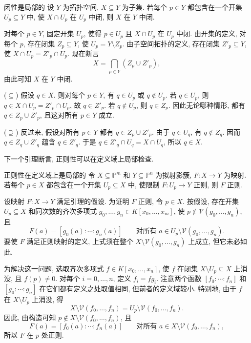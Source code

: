 \begin{Lemma}{闭性是局部的}\leavevmode\label{lem:closedness-is-local}
设 $Y$ 为拓扑空间, $X\subseteq Y$ 为子集. 若每个 $p\in Y$ 都包含在一个开集 $U_{p}\subseteq Y$ 中, 使 $X\cap U_{p}$ 在 $U_{p}$ 中闭, 则 $X$ 在 $Y$ 中闭.
\end{Lemma}
\begin{Proof}
对每个 $p\in Y$, 固定开集 $U_{p}$, 使得 $p\in U_{p}$ 且 $X\cap U_{p}$ 在 $U_{p}$ 中闭. 由开集的定义, 对每个 $p$, 存在闭集 $Z_{p}\subseteq Y$, 使 $U_{p}=Y\setminus Z_{p}$. 由子空间拓扑的定义, 存在闭集 $Z'_{p}\subseteq Y$, 使 $X\cap U_{p}=Z'_{p}\cap U_{p}$. 现在断言
\[
  X=\bigcap_{p\in Y}(Z_{p}\cup Z'_{p}),
\]
由此可知 $X$ 在 $Y$ 中闭.

($\subseteq$) 假设 $q\in X$. 则对每个 $p\in Y$, 有 $q\in U_{p}$ 或 $q\notin U_{p}$. 若 $q\in U_{p}$, 则 $q\in X\cap U_{p}=Z'_{p}\cap U_{p}$, 故 $q\in Z'_{p}$. 若 $q\notin U_{p}$, 则 $q\in Z_{p}$. 因此无论哪种情形, 都有 $q\in Z_{p}\cup Z'_{p}$, 且这对所有 $p\in Y$ 成立.

($\supseteq$) 反过来, 假设对所有 $p\in Y$ 都有 $q\in Z_{p}\cup Z'_{p}$. 由于 $q\in U_{q}$, 有 $q\notin Z_{q}$. 因而 $q\in Z_{q}\cup Z'_{q}$ 蕴含 $q\in Z'_{q}$. 于是 $q\in Z'_{q}\cap U_{q}=X\cap U_{q}$, 所以 $q\in X$.
\end{Proof}

下一个引理断言, 正则性可以在定义域上局部检查.

\begin{Lemma}{正则性在定义域上是局部的}\leavevmode\label{lem:regularity-is-local-on-domain}
令 $X\subseteq\mathbb{P}^{m}$ 和 $Y\subseteq\mathbb{P}^{n}$ 为拟射影簇, $F:X\to Y$ 为映射. 若每个 $p\in X$ 都包含在一个开集 $U_{p}\subseteq X$ 中, 使限制 $F:U_{p}\to Y$ 正则, 则 $F$ 正则.
\end{Lemma}
\begin{Proof}
设映射 $F:X\to Y$ 满足引理的假设. 为证明 $F$ 正则, 令 $p\in X$. 按假设, 存在开集 $U_{p}\subseteq X$ 和同次数的齐次多项式 $g_{0},\ldots,g_{n}\in K[x_{0},\ldots,x_{m}]$, 使 $p\notin\mathcal{V}(g_{0},\ldots,g_{n})$, 且
\[
  F(a)=[g_{0}(a):\cdots:g_{n}(a)]
  \qquad\text{对所有 }a\in U_{p}\setminus\mathcal{V}(g_{0},\ldots,g_{n}).
\]
要使 $F$ 满足正则映射的定义, 上式须在整个 $X\setminus\mathcal{V}(g_{0},\ldots,g_{n})$ 上成立, 但它未必如此.

为解决这一问题, 选取齐次多项式 $f\in K[x_{0},\ldots,x_{n}]$, 使 $f$ 在闭集 $X\setminus U_{p}\subseteq X$ 上消没, 且 $f(p)\ne0$. 对每个 $i=0,\ldots,n$, 定义 $f_{i}=fg_{i}$. 注意两个函数 $[f_{0}:\cdots:f_{n}]$ 和 $[g_{0}:\cdots:g_{n}]$ 在它们都有定义之处取值相同, 但前者的定义域较小. 特别地, 由于 $f$ 在 $X\setminus U_{p}$ 上消没, 得
\[
  X\setminus\mathcal{V}(f_{0},\ldots,f_{n})
    =U_{p}\setminus\mathcal{V}(f_{0},\ldots,f_{n}).
\]
因此, 由构造可知 $p\notin X\setminus\mathcal{V}(f_{0},\ldots,f_{n})$, 且
\[
  F(a)=[f_{0}(a):\cdots:f_{n}(a)]
  \qquad\text{对所有 }a\in X\setminus\mathcal{V}(f_{0},\ldots,f_{n}),
\]
所以 $F$ 在 $p$ 处正则.
\end{Proof}


